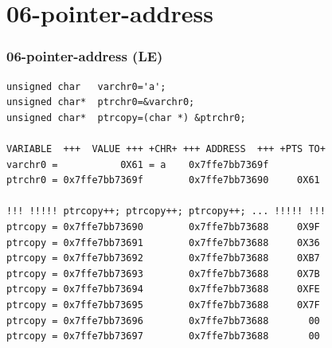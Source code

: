 \documentclass[xcolor=table, notheorems, hyperref={pdfpagelabels=false}]{beamer}
\begin{document}
\section{06-pointer-address}
\begin{frame}[fragile]
\frametitle{06-pointer-address (LE)}
\begin{lstlisting}[basicstyle=\ttfamily\footnotesize]
unsigned char   varchr0='a';
unsigned char*  ptrchr0=&varchr0;
unsigned char*  ptrcopy=(char *) &ptrchr0;

VARIABLE  +++  VALUE +++ +CHR+ +++ ADDRESS  +++ +PTS TO+
varchr0 =           0X61 = a    0x7ffe7bb7369f
ptrchr0 = 0x7ffe7bb7369f        0x7ffe7bb73690     0X61

!!! !!!!! ptrcopy++; ptrcopy++; ptrcopy++; ... !!!!! !!!
ptrcopy = 0x7ffe7bb73690        0x7ffe7bb73688     0X9F
ptrcopy = 0x7ffe7bb73691        0x7ffe7bb73688     0X36
ptrcopy = 0x7ffe7bb73692        0x7ffe7bb73688     0XB7
ptrcopy = 0x7ffe7bb73693        0x7ffe7bb73688     0X7B
ptrcopy = 0x7ffe7bb73694        0x7ffe7bb73688     0XFE
ptrcopy = 0x7ffe7bb73695        0x7ffe7bb73688     0X7F
ptrcopy = 0x7ffe7bb73696        0x7ffe7bb73688       00
ptrcopy = 0x7ffe7bb73697        0x7ffe7bb73688       00
\end{lstlisting}

\end{frame}

\end{document}
